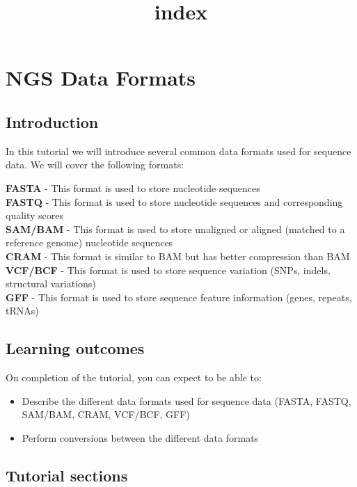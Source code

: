 \documentclass[11pt]{article}
\title{index}
\providecommand{\tightlist}{%
      \setlength{\itemsep}{0pt}\setlength{\parskip}{0pt}}
\begin{document}
    \hypertarget{ngs-data-formats}{%
\section{NGS Data Formats}\label{ngs-data-formats}}

\hypertarget{introduction}{%
\subsection{Introduction}\label{introduction}}

In this tutorial we will introduce several common data formats used for
sequence data. We will cover the following formats:

\textbf{FASTA} - This format is used to store nucleotide sequences\\
\textbf{FASTQ} - This format is used to store nucleotide sequences and
corresponding quality scores\\
\textbf{SAM/BAM} - This format is used to store unaligned or aligned
(matched to a reference genome) nucleotide sequences\\
\textbf{CRAM} - This format is similar to BAM but has better compression
than BAM\\
\textbf{VCF/BCF} - This format is used to store sequence variation
(SNPs, indels, structural variations)\\
\textbf{GFF} - This format is used to store sequence feature information
(genes, repeats, tRNAs)

\hypertarget{learning-outcomes}{%
\subsection{Learning outcomes}\label{learning-outcomes}}

On completion of the tutorial, you can expect to be able to:

\begin{itemize}
\tightlist
\item
  Describe the different data formats used for sequence data (FASTA,
  FASTQ, SAM/BAM, CRAM, VCF/BCF, GFF)
\item
  Perform conversions between the different data formats
\end{itemize}

\hypertarget{tutorial-sections}{%
\subsection{Tutorial sections}\label{tutorial-sections}}
\end{document}

